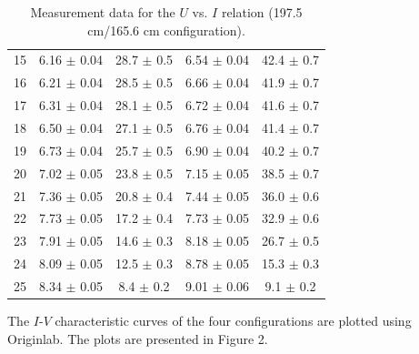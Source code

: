 \documentclass{article}
\begin{document}
{\begin{table}[H]
\begin{tabular}{ccc||cc}
        15 & 6.16  $\pm$ 0.04               & 28.7  $\pm$ 0.5              & 6.54  $\pm$ 0.04 & 42.4  $\pm$ 0.7 \\
        16 & 6.21  $\pm$ 0.04               & 28.5  $\pm$ 0.5              & 6.66  $\pm$ 0.04 & 41.9  $\pm$ 0.7 \\
        17 & 6.31  $\pm$ 0.04               & 28.1  $\pm$ 0.5              & 6.72  $\pm$ 0.04 & 41.6  $\pm$ 0.7 \\
        18 & 6.50  $\pm$ 0.04               & 27.1  $\pm$ 0.5              & 6.76  $\pm$ 0.04 & 41.4  $\pm$ 0.7 \\
        19 & 6.73  $\pm$ 0.04               & 25.7  $\pm$ 0.5              & 6.90  $\pm$ 0.04 & 40.2  $\pm$ 0.7 \\
        20 & 7.02  $\pm$ 0.05               & 23.8  $\pm$ 0.5              & 7.15  $\pm$ 0.05 & 38.5  $\pm$ 0.7 \\
        21 & 7.36  $\pm$ 0.05               & 20.8  $\pm$ 0.4              & 7.44  $\pm$ 0.05 & 36.0  $\pm$ 0.6 \\
        22 & 7.73  $\pm$ 0.05               & 17.2  $\pm$ 0.4              & 7.73  $\pm$ 0.05 & 32.9  $\pm$ 0.6 \\
        23 & 7.91  $\pm$ 0.05               & 14.6  $\pm$ 0.3              & 8.18  $\pm$ 0.05 & 26.7  $\pm$ 0.5 \\
        24 & 8.09  $\pm$ 0.05               & 12.5  $\pm$ 0.3              & 8.78  $\pm$ 0.05 & 15.3  $\pm$ 0.3 \\
        25 & 8.34  $\pm$ 0.05               & 8.4   $\pm$ 0.2              & 9.01  $\pm$ 0.06 & 9.1   $\pm$ 0.2 \\
        \bottomrule
    \end{tabular}
    \caption{Measurement data for the $U$ vs. $I$ relation (197.5 cm/165.6 cm configuration).}\label{TableUI100}
\end{table}

The $I$-$V$ characteristic curves of the four configurations are plotted using Originlab. The plots are presented in Figure 2.

}
\end{document}
